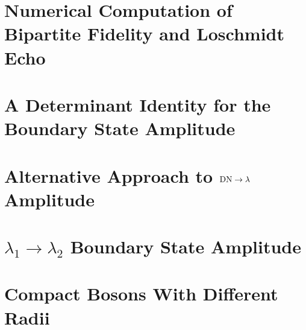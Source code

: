 \documentclass[preprint, prb]{revtex4-1}
\begin{document}
\section{Numerical Computation of Bipartite Fidelity and Loschmidt Echo}
\label{app:comp_fid_echo}


\section{A Determinant Identity for the Boundary State Amplitude}
\label{app:pf_of_id}


\section{Alternative Approach to ${\rm DN} \rightarrow \lambda$ Amplitude}
\label{app:gnd_dn_lambda}


\section{$\lambda_1 \rightarrow \lambda_2$ Boundary State Amplitude}
\label{app:lambda_12}


\section{Compact Bosons With Different Radii}
\label{app:compact_diff_boson}




\end{document}
